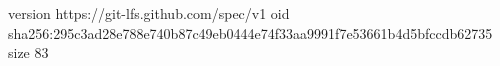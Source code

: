 version https://git-lfs.github.com/spec/v1
oid sha256:295c3ad28e788e740b87c49eb0444e74f33aa9991f7e53661b4d5bfccdb62735
size 83
